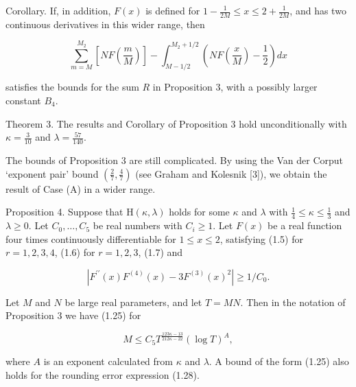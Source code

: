 \documentclass[10pt]{article}
\begin{document}
Corollary. If, in addition, $F(x)$ is defined for $1-\frac{1}{2M} \leqslant x \leqslant 2+\frac{1}{2M}$, and has two continuous derivatives in this wider range, then


\begin{equation*}
\sum_{m=M}^{M_{2}}\left[N F\left(\frac{m}{M}\right)\right]-\int_{M-1 / 2}^{M_{2}+1 / 2}\left(N F\left(\frac{x}{M}\right)-\frac{1}{2}\right) d x \tag{1.28}
\end{equation*}


satisfies the bounds for the sum $R$ in Proposition 3, with a possibly larger constant $B_{4}$.

Theorem 3. The results and Corollary of Proposition 3 hold unconditionally with $\kappa=\frac{3}{10}$ and $\lambda=\frac{57}{140}$.

The bounds of Proposition 3 are still complicated. By using the Van der Corput `exponent pair' bound $\left(\frac{2}{7}, \frac{4}{7}\right)$ (see Graham and Kolesnik [3]), we obtain the result of Case (A) in a wider range.

Proposition 4. Suppose that $\mathrm{H}(\kappa, \lambda)$ holds for some $\kappa$ and $\lambda$ with $\frac{1}{4} \leqslant \kappa \leqslant \frac{1}{3}$ and $\lambda \geqslant 0$. Let $C_{0}, \ldots, C_{5}$ be real numbers with $C_{i} \geqslant 1$. Let $F(x)$ be a real function four times continuously differentiable for $1 \leqslant x \leqslant 2$, satisfying (1.5) for $r=1,2,3,4$, (1.6) for $r=1,2,3$, (1.7) and


\begin{equation*}
\left|F^{\prime \prime}(x) F^{(4)}(x)-3 F^{(3)}(x)^{2}\right| \geqslant 1 / C_{0}. \tag{1.29}
\end{equation*}


Let $M$ and $N$ be large real parameters, and let $T=M N$. Then in the notation of Proposition 3 we have (1.25) for


\begin{equation*}
M \leqslant C_{5} T^{\frac{123 \kappa-13}{212 \kappa-22}}(\log T)^{A}, \tag{1.30}
\end{equation*}


where $A$ is an exponent calculated from $\kappa$ and $\lambda$. A bound of the form (1.25) also holds for the rounding error expression (1.28).
\end{document}
